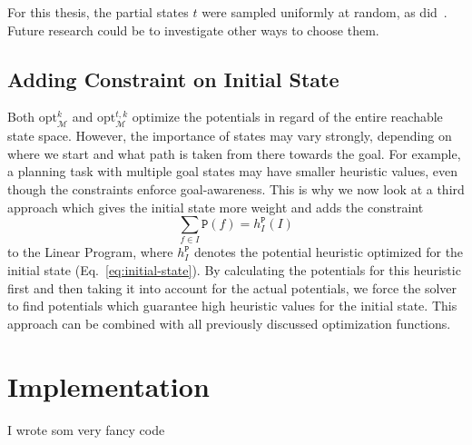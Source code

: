 For this thesis, the partial states $t$ were sampled uniformly at random, as did~\citeauthor{fivser2020strengthening}.
Future research could be to investigate other ways to choose them.

\subsection{Adding Constraint on Initial State}\label{subsec:adding-constraint-on-initial-state}
Both $\mathrm{opt}^k_\mathcal{M}$ and $\mathrm{opt}^{t,k}_\mathcal{M}$ optimize the potentials in regard of the entire reachable state space.
However, the importance of states may vary strongly, depending on where we start and what path is taken from there towards the goal.
For example, a planning task with multiple goal states may have smaller heuristic values, even though the constraints enforce goal-awareness.
This is why we now look at a third approach which gives the initial state more weight and adds the constraint  \begin{equation}\sum_{f\in I}\mathtt{P}(f)=h^\mathtt{P}_I (I)\end{equation} to the Linear Program, where $h^\mathtt{P}_I$ denotes the potential heuristic optimized for the initial state (Eq.~\eqref{eq:initial-state}).
By calculating the potentials for this heuristic first and then taking it into account for the actual potentials, we force the solver to find potentials which guarantee high heuristic values for the initial state.
This approach can be combined with all previously discussed optimization functions.

\section{Implementation}\label{sec:implementation}
I wrote som very fancy code